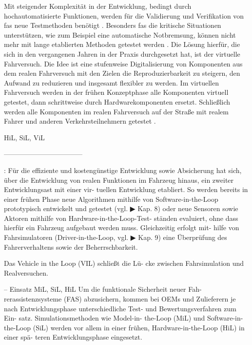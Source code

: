 Mit steigender Komplexität in der Entwicklung, bedingt durch hochautomatisierte Funktionen, werden für die Validierung und Verifikation von \gls{fas} neue Testmethoden benötigt \cite{bach2017reactive}. Besonders \gls{fas} die kritische Situationen unterstützen, wie zum Beispiel eine automatische Notbremsung, können nicht mehr mit lange etablierten Methoden getestet werden \cite{bock2008vehicle}. Die Lösung hierfür, die sich in den vergangenen Jahren in der Praxis durchgesetzt hat, ist der virtuelle Fahrversuch. Die Idee ist eine stufenweise Digitalisierung von Komponenten aus dem realen Fahrversuch mit den Zielen die Reproduzierbarkeit zu steigern, den Aufwand zu reduzieren und insgesamt flexibler zu werden. Im virtuellen Fahrversuch werden in der frühen Konzeptphase alle Komponenten virtuell getestet, dann schrittweise durch Hardwarekomponenten ersetzt. Schließlich werden alle Komponenten im realen Fahrversuch auf der Straße mit realem Fahrer und anderen Verkehrsteilnehmern getestet \cite{hakuli2015virtuelle}.



HiL, SiL, ViL


-----------------------------------


\cite{berg2015vehicle}:
Für die effiziente und kostengünstige Entwicklung sowie Absicherung hat sich, über die Entwicklung von realen Funktionen im Fahrzeug hinaus, ein zweiter Entwicklungsast mit einer vir- tuellen Entwicklung etabliert. So werden bereits in einer frühen Phase neue Algorithmen mithilfe von Software-in-the-Loop prototypisch entwickelt und getestet (vgl. ▶ Kap. 8) oder neue Sensoren sowie Aktoren mithilfe von Hardware-in-the-Loop-Test- ständen evaluiert, ohne dass hierfür ein Fahrzeug aufgebaut werden muss. Gleichzeitig erfolgt mit- hilfe von Fahrsimulatoren (Driver-in-the-Loop, vgl. ▶ Kap. 9) eine Überprüfung des Fahrerverhaltens sowie der Beherrschbarkeit.

Das Vehicle in the Loop (VIL) schließt die Lü- cke zwischen Fahrsimulation und Realversuchen.


-- Einsatz MiL, SiL, HiL
Um die funktionale Sicherheit neuer Fah- rerassistenzsysteme (FAS) abzusichern, kommen bei OEMs und Zulieferern je nach Entwicklungsphase unterschiedliche Test- und Bewertungsverfahren zum Ein- satz. Simulationsmethoden wie Model-in- the-Loop (MiL) und Software-in-the-Loop (SiL) werden vor allem in einer frühen, Hardware-in-the-Loop (HiL) in einer spä- teren Entwicklungsphase eingesetzt. \cite{schwab2014durchgangige}


